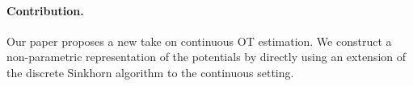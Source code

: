 \paragraph{Contribution.}

Our paper proposes a new take on continuous OT estimation. We construct a
non-parametric representation of the potentials by directly using an extension
of the discrete Sinkhorn algorithm to the continuous setting.



